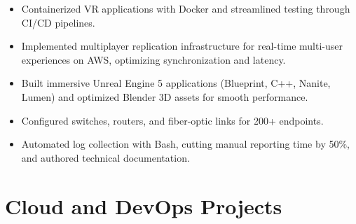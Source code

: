 \documentclass[a4paper,10pt]{article}
\begin{document}
\begin{itemize}
  \item Containerized VR applications with Docker and streamlined testing through CI/CD pipelines.
  \item Implemented multiplayer replication infrastructure for real-time multi-user experiences on AWS, optimizing synchronization and latency.
  \item Built immersive Unreal Engine 5 applications (Blueprint, C++, Nanite, Lumen) and optimized Blender 3D assets for smooth performance.
\end{itemize}
\begin{itemize}
  \item Configured switches, routers, and fiber-optic links for 200+ endpoints.
  \item Automated log collection with Bash, cutting manual reporting time by 50\%, and authored technical documentation.
\end{itemize}

\section*{Cloud and DevOps Projects}
\pAIS
\pResumePipe
\pCapstone
\pCICD
\pTDDBDD
\pTekton
\pTDDSuites
\pKube
\pOpenShift
\pCodeEngine
\pRobotShop
\pAWSHA
\pTerraformGCP
\pWAF
\pAWSFound
\pAWSWeb
\pAWSNet
\pAWSRDS
\pAWSSec
\pAWSIaC
\pAWSServerless
\pAWSHybrid
\pEmotion
\pGitFlow
\pAgile
\pAirflow
\pHive
\pBackup
\pWeatherETL
\pGDP
\pFlaskAPI
\pXpose
\pDocker
\pDevContainer
\end{document}

